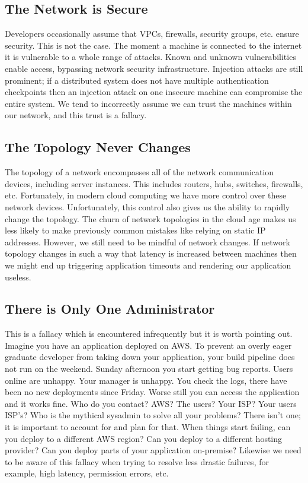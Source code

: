 \subsection{The Network is Secure}
Developers occasionally assume that VPCs, firewalls, security groups, etc. ensure security.
This is not the case.
The moment a machine is connected to the internet it is vulnerable to a whole range of attacks.
Known and unknown vulnerabilities enable access, bypassing network security infrastructure.
Injection attacks are still prominent;
if a distributed system does not have multiple authentication checkpoints then an injection attack on one insecure machine can compromise the entire system.
We tend to incorrectly assume we can trust the machines within our network,
and this trust is a fallacy.

\subsection{The Topology Never Changes}
The topology of a network encompasses all of the network communication devices, including server instances.
This includes routers, hubs, switches, firewalls, etc.
Fortunately, in modern cloud computing we have more control over these network devices.
Unfortunately, this control also gives us the ability to rapidly change the topology.
The churn of network topologies in the cloud age makes us less likely to make previously common mistakes like relying on static IP addresses.
However, we still need to be mindful of network changes.
If network topology changes in such a way that latency is increased between machines then we might end up triggering application timeouts and rendering our application useless.

\subsection{There is Only One Administrator}
This is a fallacy which is encountered infrequently but it is worth pointing out.
Imagine you have an application deployed on AWS.
To prevent an overly eager graduate developer from taking down your application,
your build pipeline does not run on the weekend.
Sunday afternoon you start getting bug reports.
Users online are unhappy.
Your manager is unhappy.
You check the logs,
there have been no new deployments since Friday.
Worse still you can access the application and it works fine.
Who do you contact?
AWS? The users? Your ISP? Your users ISP's?
Who is the mythical sysadmin to solve all your problems?
There isn't one; it is important to account for and plan for that.
When things start failing, can you deploy to a different AWS region?
Can you deploy to a different hosting provider?
Can you deploy parts of your application on-premise?
Likewise we need to be aware of this fallacy when trying to resolve less drastic failures, for example, high latency, permission errors, etc.

